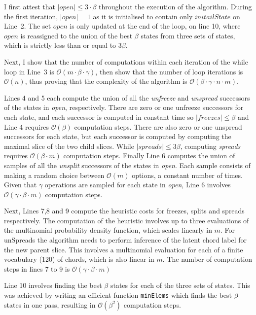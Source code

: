 \documentclass[12pt,a4paper,twoside,openany]{report} \usepackage[pdfborder={0 0 0}]{hyperref}    %
\theoremstyle{definition} \newtheorem{definition}{Definition}[section]
\begin{document}
I first attest that $|open| \leq 3\cdot \beta$ throughout the execution of the algorithm. 
During the first iteration, $|open| = 1$ as it is initialised to contain only $initailState$ on Line~2.
The set $open$ is only updated at the end of the loop, on line 10, where $open$ is reassigned to the union of the best
$\beta$ states from three sets of states, which is strictly less than or equal to $3\beta$.

Next, I show that the number of computations within each iteration of the while loop in Line~3 is $\mathcal{O}(m \cdot
\beta \cdot \gamma )$, then
show that the number of loop iterations is $\mathcal{O}(n)$, thus proving that the complexity of the algorithm is
$\mathcal{O}(\beta \cdot \gamma \cdot n\cdot m)$. 

Lines 4 and 5 each compute the union of all the \textit{unfreeze} and \textit{unspread} successors of the states in
\textit{open}, respectively. There are zero or one unfreeze successors for each state, and each successor is computed in
constant time so $|freezes| \leq \beta$ and Line 4 requires $\mathcal{O}(\beta)$ computation steps.
There are also zero or one unspread successors for each state, but each successor is computed by computing the maximal
slice of the two child slices. While $|spreads| \leq 3\beta$, computing \textit{spreads} requires $\mathcal{O}(\beta \cdot m)$ computation steps. 
Finally Line 6 computes the union of samples of all the \textit{unsplit} successors of the states in \textit{open}. Each
sample consists of making a random choice between $\mathcal{O}(m)$ options, a constant number of times. Given that
$\gamma$ operations are sampled for each state in \textit{open}, Line 6 involves $\mathcal{O}(\gamma \cdot \beta \cdot m)$ computation steps.

Next, Lines 7,8 and 9 compute the heuristic costs for freezes, splits and spreads respectively. The computation of the
heuristic involves up to three evaluations of the multinomial probability density function, which scales linearly in
$m$. For unSpreads the algorithm needs to perform inference of the latent chord label for the new parent slice. This
involves a multinomial evaluation for each of a finite vocabulary (120) of chords, which is also linear in $m$. The
number of computation steps in lines 7 to 9 is $\mathcal{O}(\gamma \cdot \beta \cdot m)$  

Line 10 involves finding the best $\beta$ states for each of the three sets of states. This was achieved by
writing an efficient function \texttt{minElems} which finds the best $\beta$ states in one pass, resulting in
$\mathcal{O}(\beta ^2)$ computation steps.
\end{document}
